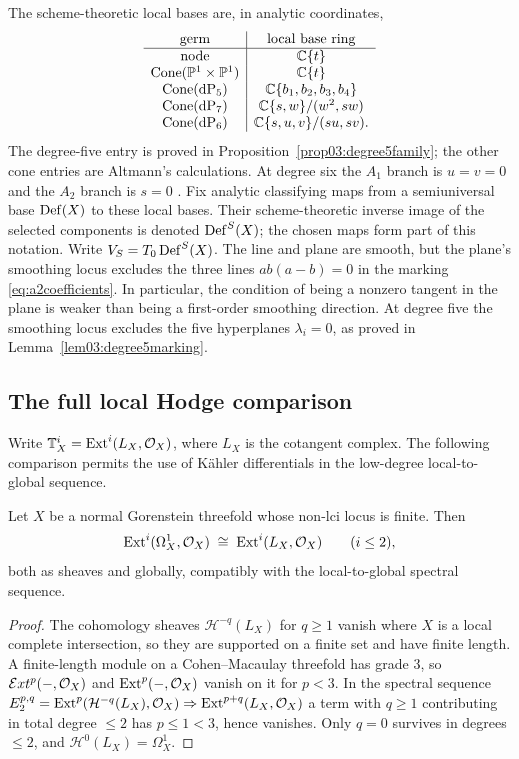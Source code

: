 The scheme-theoretic local bases are, in analytic coordinates,
\begin{equation}\label{eq:localbases}
 \begin{array}{c|c}
 \text{germ}&\text{local base ring}\\ \hline
 \text{node}&\mathbb{C}\{t\}\\
 \operatorname{Cone}(\mathbb{P}^1\times\mathbb{P}^1)&\mathbb{C}\{t\}\\
 \operatorname{Cone}(\mathrm{dP}_5)&\mathbb{C}\{b_1,b_2,b_3,b_4\}\\
 \operatorname{Cone}(\mathrm{dP}_7)&\mathbb{C}\{s,w\}/(w^2,sw)\\
 \operatorname{Cone}(\mathrm{dP}_6)&\mathbb{C}\{s,u,v\}/(su,sv).
 \end{array}
\end{equation}
The degree-five entry is proved in
Proposition~\ref{prop03:degree5family}; the other cone entries are
Altmann's calculations.  At degree six the $A_1$ branch is $u=v=0$ and the $A_2$ branch is
$s=0$ \cite[(2.5), (9.1)(v), \S\S5--8]{Altmann97}.  Fix analytic classifying maps from
a semiuniversal base $\operatorname{Def}(X)$ to these local bases.  Their
scheme-theoretic inverse image of the selected components is denoted
$\operatorname{Def}^S(X)$; the chosen maps form part of this notation.  Write
$V_S=T_0\operatorname{Def}^S(X)$.  The line and plane are smooth, but the plane's
smoothing locus excludes the three lines
$ab(a-b)=0$ in the marking \eqref{eq:a2coefficients}.  In particular,
the condition of being a nonzero tangent in the plane is weaker than
being a first-order smoothing direction.
At degree five the smoothing locus excludes the five hyperplanes
$\lambda_i=0$, as proved in Lemma~\ref{lem03:degree5marking}.

\subsection{The full local Hodge comparison}
Write $\mathbb T^i_X=\operatorname{Ext}^i(L_X,\mathcal{O}_X)$, where $L_X$ is
the cotangent complex.  The following comparison permits the use of
K\"ahler differentials in the low-degree local-to-global sequence.

\begin{lemma}\label{lem:omegaL}
Let $X$ be a normal Gorenstein threefold whose non-lci locus is finite.  Then
\[
  \mathrm{Ext}^i(\Omega^1_X,\mathcal{O}_X)\;\cong\;\mathrm{Ext}^i(L_X,\mathcal{O}_X)
  \qquad(i\le2),
\]
both as sheaves and globally, compatibly with the local-to-global spectral
sequence.
\end{lemma}

\begin{proof}
The cohomology sheaves $\mathcal H^{-q}(L_X)$ for $q\ge1$ vanish where $X$ is a
local complete intersection, so they are supported on a finite set and have
finite length.  A finite-length module on a Cohen--Macaulay threefold has grade
$3$, so $\mathcal Ext^p(-,\mathcal{O}_X)$ and $\mathrm{Ext}^p(-,\mathcal{O}_X)$ vanish on it for
$p<3$.  In the spectral sequence
$E_2^{p,q}=\mathrm{Ext}^p(\mathcal H^{-q}(L_X),\mathcal{O}_X)\Rightarrow
\mathrm{Ext}^{p+q}(L_X,\mathcal{O}_X)$ a term with $q\ge1$ contributing in total degree
$\le2$ has $p\le1<3$, hence vanishes.  Only $q=0$ survives in degrees $\le2$, and
$\mathcal H^0(L_X)=\Omega^1_X$.
\end{proof}

